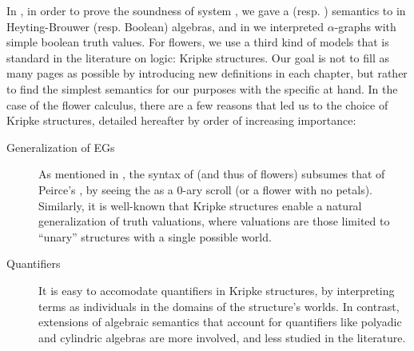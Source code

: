\begin{scope}
In , in order to prove the soundness of system
, we gave a  (resp. ) semantics to  in
Heyting-Brouwer (resp. Boolean) algebras, and in  we
interpreted $\alpha$-graphs with simple boolean truth values. For flowers, we
use a third kind of models that is standard in the literature on 
logic: Kripke structures. Our goal is not to fill as many pages as possible by
introducing new definitions in each chapter, but rather to find the simplest
semantics for our purposes with the specific  at hand. In the case
of the flower calculus, there are a few reasons that led us to the choice of
Kripke structures, detailed hereafter by order of increasing importance:
\begin{description}
  \item[Generalization of EGs]
    As mentioned in , the syntax of   (and thus of
    flowers) subsumes that of Peirce's  , by seeing the  as a
    $0$-ary scroll (or a flower with no petals). Similarly, it is well-known
    that Kripke structures enable a natural generalization of truth valuations,
    where  valuations are those limited to ``unary'' structures with a
    single possible world.
  
  \item[Quantifiers]
    It is easy to accomodate quantifiers in Kripke structures, by interpreting
    terms as individuals in the domains of the structure's worlds. In contrast,
    extensions of algebraic semantics that account for quantifiers like polyadic
    and cylindric algebras are more involved, and less studied in the
    literature.
  

\end{description}
\end{scope}
